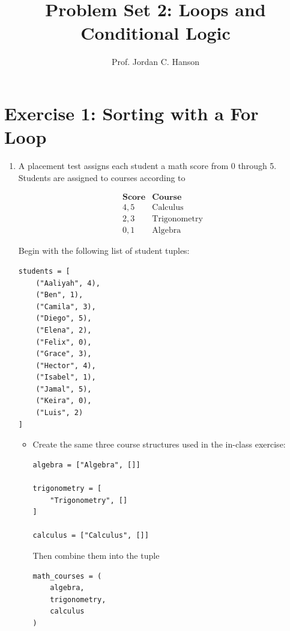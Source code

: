 \documentclass{article}
\begin{document}
\twocolumn

\title{Problem Set 2: Loops and Conditional Logic}
\author{Prof. Jordan C. Hanson}

\maketitle

\section{Exercise 1: Sorting with a For Loop}

\begin{enumerate}

\item A placement test assigns each student a math score from
0 through 5.  Students are assigned to courses according to

\[
\begin{array}{c|c}
\textbf{Score} & \textbf{Course} \\ \hline
4,5 & \text{Calculus} \\
2,3 & \text{Trigonometry} \\
0,1 & \text{Algebra}
\end{array}
\]

Begin with the following list of student tuples:

\begin{verbatim}
students = [
    ("Aaliyah", 4),
    ("Ben", 1),
    ("Camila", 3),
    ("Diego", 5),
    ("Elena", 2),
    ("Felix", 0),
    ("Grace", 3),
    ("Hector", 4),
    ("Isabel", 1),
    ("Jamal", 5),
    ("Keira", 0),
    ("Luis", 2)
]
\end{verbatim}

\begin{itemize}

\item Create the same three course structures used in the
in-class exercise:

\begin{verbatim}
algebra = ["Algebra", []]

trigonometry = [
    "Trigonometry", []
]

calculus = ["Calculus", []]
\end{verbatim}

Then combine them into the tuple

\begin{verbatim}
math_courses = (
    algebra,
    trigonometry,
    calculus
)
\end{verbatim}


\end{itemize}
\end{enumerate}
\end{document}
